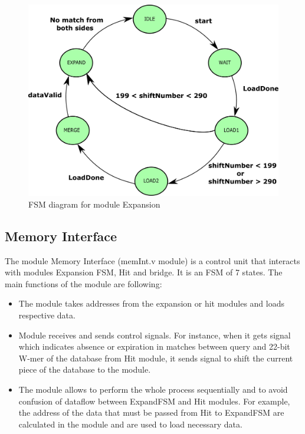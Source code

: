 \begin{figure}[t!]
\centering
\includegraphics[width=\columnwidth]{Figures/expandFSM.pdf}
\caption{FSM diagram for module Expansion} \label{fig:expandFSM}
\end{figure}
       
       
\subsection{Memory Interface}
\quad The module Memory Interface (memInt.v module) is a control unit that interacts with modules Expansion FSM, Hit and bridge. It is an FSM of 7 states. The main functions of the module are following:
\begin{itemize}
\item The module takes addresses from the expansion or hit modules and loads respective data.
\item Module receives and sends control signals. For instance, when it gets signal which indicates absence or expiration in matches between query and 22-bit W-mer of the database from Hit module, it sends signal to shift the current piece of the database to the module.
\item The module allows to perform the whole process sequentially and to avoid confusion of dataflow between ExpandFSM and Hit modules. For example, the address of the data that must be passed from Hit to ExpandFSM are calculated in the module and are used to load necessary data.
\end{itemize}

